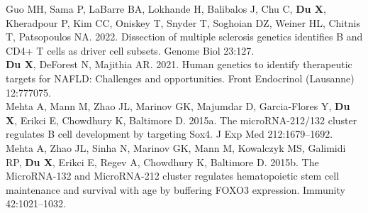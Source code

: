 \documentclass[11pt]{formatting-template}
\begin{document}
\begin{vita}
\noindent Guo MH, Sama P, LaBarre BA, Lokhande H, Balibalos J, Chu C, \textbf{Du X}, Kheradpour P, Kim CC, Oniskey T, Snyder T, Soghoian DZ, Weiner HL, Chitnis T, Patsopoulos NA. 2022. Dissection of multiple sclerosis genetics identifies B and CD4+ T cells as driver cell subsets. Genome Biol 23:127.
\\

\noindent \textbf{Du X}, DeForest N, Majithia AR. 2021. Human genetics to identify therapeutic targets for NAFLD: Challenges and opportunities. Front Endocrinol (Lausanne) 12:777075.
\\

\noindent Mehta A, Mann M, Zhao JL, Marinov GK, Majumdar D, Garcia-Flores Y, \textbf{Du X}, Erikci E, Chowdhury K, Baltimore D. 2015a. The microRNA-212/132 cluster regulates B cell development by targeting Sox4. J Exp Med 212:1679–1692.
\\

\noindent Mehta A, Zhao JL, Sinha N, Marinov GK, Mann M, Kowalczyk MS, Galimidi RP, \textbf{Du X}, Erikci E, Regev A, Chowdhury K, Baltimore D. 2015b. The MicroRNA-132 and MicroRNA-212 cluster regulates hematopoietic stem cell maintenance and survival with age by buffering FOXO3 expression. Immunity 42:1021–1032.


\end{vita}
\end{document}
